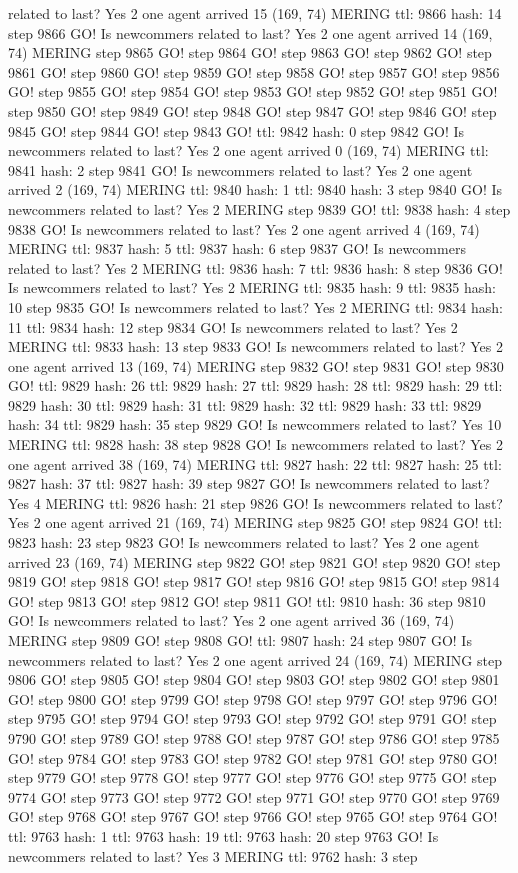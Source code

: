 related to last? Yes 2 one agent arrived 15 (169, 74) MERING ttl: 9866 hash: 14 step 9866 GO! Is newcommers related to last? Yes 2 one agent arrived 14 (169, 74) MERING step 9865 GO! step 9864 GO! step 9863 GO! step 9862 GO! step 9861 GO! step 9860 GO! step 9859 GO! step 9858 GO! step 9857 GO! step 9856 GO! step 9855 GO! step 9854 GO! step 9853 GO! step 9852 GO! step 9851 GO! step 9850 GO! step 9849 GO! step 9848 GO! step 9847 GO! step 9846 GO! step 9845 GO! step 9844 GO! step 9843 GO! ttl: 9842 hash: 0 step 9842 GO! Is newcommers related to last? Yes 2 one agent arrived 0 (169, 74) MERING ttl: 9841 hash: 2 step 9841 GO! Is newcommers related to last? Yes 2 one agent arrived 2 (169, 74) MERING ttl: 9840 hash: 1 ttl: 9840 hash: 3 step 9840 GO! Is newcommers related to last? Yes 2 MERING step 9839 GO! ttl: 9838 hash: 4 step 9838 GO! Is newcommers related to last? Yes 2 one agent arrived 4 (169, 74) MERING ttl: 9837 hash: 5 ttl: 9837 hash: 6 step 9837 GO! Is newcommers related to last? Yes 2 MERING ttl: 9836 hash: 7 ttl: 9836 hash: 8 step 9836 GO! Is newcommers related to last? Yes 2 MERING ttl: 9835 hash: 9 ttl: 9835 hash: 10 step 9835 GO! Is newcommers related to last? Yes 2 MERING ttl: 9834 hash: 11 ttl: 9834 hash: 12 step 9834 GO! Is newcommers related to last? Yes 2 MERING ttl: 9833 hash: 13 step 9833 GO! Is newcommers related to last? Yes 2 one agent arrived 13 (169, 74) MERING step 9832 GO! step 9831 GO! step 9830 GO! ttl: 9829 hash: 26 ttl: 9829 hash: 27 ttl: 9829 hash: 28 ttl: 9829 hash: 29 ttl: 9829 hash: 30 ttl: 9829 hash: 31 ttl: 9829 hash: 32 ttl: 9829 hash: 33 ttl: 9829 hash: 34 ttl: 9829 hash: 35 step 9829 GO! Is newcommers related to last? Yes 10 MERING ttl: 9828 hash: 38 step 9828 GO! Is newcommers related to last? Yes 2 one agent arrived 38 (169, 74) MERING ttl: 9827 hash: 22 ttl: 9827 hash: 25 ttl: 9827 hash: 37 ttl: 9827 hash: 39 step 9827 GO! Is newcommers related to last? Yes 4 MERING ttl: 9826 hash: 21 step 9826 GO! Is newcommers related to last? Yes 2 one agent arrived 21 (169, 74) MERING step 9825 GO! step 9824 GO! ttl: 9823 hash: 23 step 9823 GO! Is newcommers related to last? Yes 2 one agent arrived 23 (169, 74) MERING step 9822 GO! step 9821 GO! step 9820 GO! step 9819 GO! step 9818 GO! step 9817 GO! step 9816 GO! step 9815 GO! step 9814 GO! step 9813 GO! step 9812 GO! step 9811 GO! ttl: 9810 hash: 36 step 9810 GO! Is newcommers related to last? Yes 2 one agent arrived 36 (169, 74) MERING step 9809 GO! step 9808 GO! ttl: 9807 hash: 24 step 9807 GO! Is newcommers related to last? Yes 2 one agent arrived 24 (169, 74) MERING step 9806 GO! step 9805 GO! step 9804 GO! step 9803 GO! step 9802 GO! step 9801 GO! step 9800 GO! step 9799 GO! step 9798 GO! step 9797 GO! step 9796 GO! step 9795 GO! step 9794 GO! step 9793 GO! step 9792 GO! step 9791 GO! step 9790 GO! step 9789 GO! step 9788 GO! step 9787 GO! step 9786 GO! step 9785 GO! step 9784 GO! step 9783 GO! step 9782 GO! step 9781 GO! step 9780 GO! step 9779 GO! step 9778 GO! step 9777 GO! step 9776 GO! step 9775 GO! step 9774 GO! step 9773 GO! step 9772 GO! step 9771 GO! step 9770 GO! step 9769 GO! step 9768 GO! step 9767 GO! step 9766 GO! step 9765 GO! step 9764 GO! ttl: 9763 hash: 1 ttl: 9763 hash: 19 ttl: 9763 hash: 20 step 9763 GO! Is newcommers related to last? Yes 3 MERING ttl: 9762 hash: 3 step 